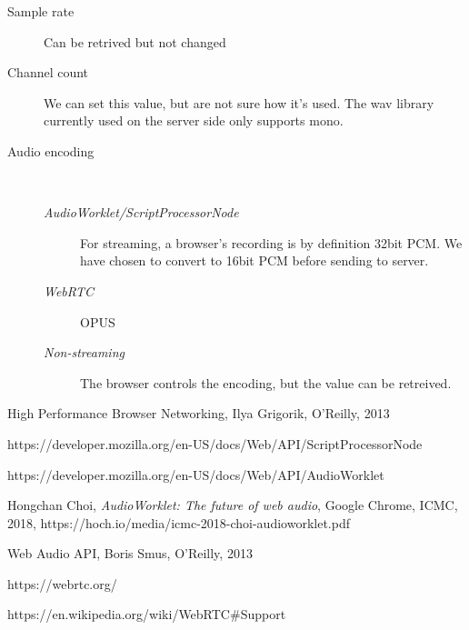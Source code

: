 \documentclass[11pt, a4paper, twoside]{article}
\begin{document}
\begin{description}
\item[Sample rate] Can be retrived but not changed
\item[Channel count] We can set this value, but are not sure how it's used. The wav library currently used on the server side only supports mono.
\item[Audio encoding]\ \\[-14pt]
  \begin{description}
  \item[\em{AudioWorklet/ScriptProcessorNode}] For streaming, a browser's recording is by definition 32bit PCM. We have chosen to convert to 16bit PCM before sending to server.
  \item[\em{WebRTC}] OPUS
  \item[\em{ Non-streaming}] The browser controls the encoding, but the value can be retreived.
    
  \end{description}

\end{description}



\begin{thebibliography}{9}

  High Performance Browser Networking,
  Ilya Grigorik,
  O'Reilly,
  2013
  
  https://developer.mozilla.org/en-US/docs/Web/API/ScriptProcessorNode

  https://developer.mozilla.org/en-US/docs/Web/API/AudioWorklet

  Hongchan Choi,
  \textit{AudioWorklet: The future of web audio},
  Google Chrome,
  ICMC,
  2018,
  https://hoch.io/media/icmc-2018-choi-audioworklet.pdf

  Web Audio API,
  Boris Smus,
  O'Reilly,
  2013

  https://webrtc.org/
  
  https://en.wikipedia.org/wiki/WebRTC\#Support
  
\end{thebibliography}
\end{document}
